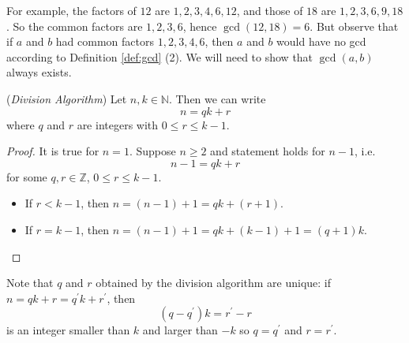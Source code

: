 \documentclass[10pt, a4paper, twoside]{report}
\begin{document}
For example, the factors of \(12\) are \(1,2,3,4,6,12\), and those of \(18\) are \(1,2,3,6,9,18\). So the common factors are \(1,2,3,6\), hence \(\gcd(12,18)=6\). But observe that if \(a\) and \(b\) had common factors \(1,2,3,4,6\), then \(a\) and \(b\) would have no gcd according to Definition \ref{def:gcd} (2). We will need to show that \(\gcd(a,b)\) always exists.
\begin{proposition}
    (\emph{Division Algorithm}) Let \(n,k\in\mathbb{N}\). Then we can write \[n=qk+r\] where \(q\) and \(r\) are integers with \(0\leq r\leq k-1\).
    \label{prop:da}
\end{proposition}
\begin{proof}
    It is true for \(n=1\). Suppose \(n\geq 2\) and statement holds for \(n-1\), i.e. \[n-1=qk+r\] for some \(q,r\in\mathbb{Z}\), \(0\leq r\leq k-1\).
    \begin{itemize}
        \item If \(r<k-1\), then \(n=(n-1)+1=qk+(r+1)\).
        \item If \(r=k-1\), then \(n=(n-1)+1=qk+(k-1)+1=(q+1)k\).
    \end{itemize}
\end{proof}
Note that \(q\) and \(r\) obtained by the division algorithm are unique: if \(n=qk+r=q^\prime k+r^\prime\), then 
\[(q-q^\prime)k=r^\prime-r\]
is an integer smaller than \(k\) and larger than \(-k\) so \(q=q^\prime\) and \(r=r^\prime\).
\end{document}
